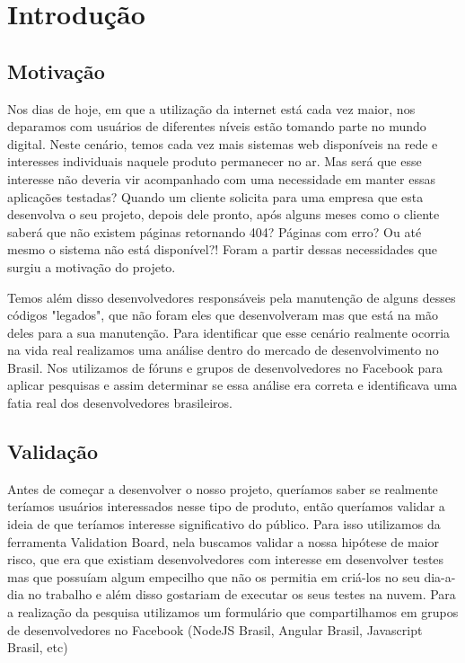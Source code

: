 \chapter{Introdução}\label{chp:LABEL_CHP_1}

\section{Motivação}\label{sec:LABEL_CHP_1_SEC_A}

Nos dias de hoje, em que a utilização da internet está cada vez maior, nos deparamos com usuários de diferentes níveis estão tomando parte no mundo digital. Neste cenário, temos cada vez mais sistemas web disponíveis na rede e interesses individuais naquele produto permanecer no ar. Mas será que esse interesse não deveria vir acompanhado com uma necessidade em manter essas aplicações testadas? Quando um cliente solicita para uma empresa que esta desenvolva o seu projeto, depois dele pronto, após alguns meses como o cliente saberá que não existem páginas retornando 404? Páginas com erro? Ou até mesmo o sistema não está disponível?! Foram a partir dessas necessidades que surgiu a motivação do projeto. 

Temos além disso desenvolvedores responsáveis pela manutenção de alguns desses códigos "legados", que não foram eles que desenvolveram mas que está na mão deles para a sua manutenção. Para identificar que esse cenário realmente ocorria na vida real realizamos uma análise dentro do mercado de desenvolvimento no Brasil. Nos utilizamos de fóruns e grupos de desenvolvedores no Facebook para aplicar pesquisas e assim determinar se essa análise era correta e identificava uma fatia real dos desenvolvedores brasileiros.

\section{Validação}\label{sec:LABEL_CHP_1_SEC_F}
Antes de começar a desenvolver o nosso projeto, queríamos saber se realmente teríamos usuários interessados nesse tipo de produto, então queríamos validar a ideia de que teríamos interesse significativo do público. Para isso utilizamos da ferramenta Validation Board, nela buscamos validar a nossa hipótese de maior risco, que era que existiam desenvolvedores com interesse em desenvolver testes mas que possuíam algum empecilho que não os permitia em criá-los no seu dia-a-dia no trabalho e além disso gostariam de executar os seus testes na nuvem. Para a realização da pesquisa utilizamos um formulário que compartilhamos em grupos de desenvolvedores no Facebook (NodeJS Brasil, Angular Brasil, Javascript Brasil, etc) 

